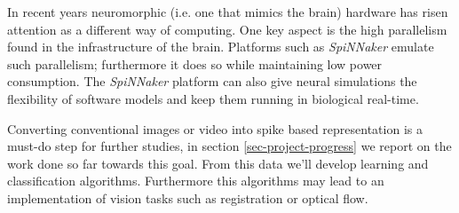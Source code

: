 In recent years neuromorphic (i.e. one that mimics the brain) hardware has
risen attention as a different way of computing. One key aspect is the high
parallelism found in the infrastructure of the brain. Platforms such as
\emph{SpiNNaker} \cite{spinnaker-review} emulate such parallelism; furthermore
it does so while maintaining low power consumption. The \emph{SpiNNaker}
platform can also give neural simulations the flexibility of software models
and keep them running in biological real-time.

Converting conventional images or video into spike based representation is a
must-do step for further studies, in section \ref{sec-project-progress} we
report on the work done so far towards this goal. From this data we'll 
develop learning and classification algorithms. Furthermore this algorithms
may lead to an implementation of vision tasks such as registration or optical
flow.
